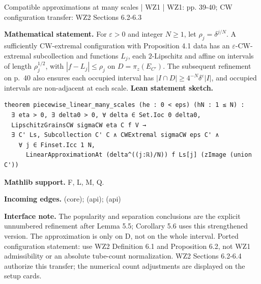 \documentclass[10pt,a4paper]{article}
\newcommand{\nodecard}[1]{\hyperlink{node-#1}{\texttt{\detokenize{#1}}}}
\begin{document}
\begin{minipage}{\linewidth}
\hypertarget{node-L5_5}{}
\begin{tcolorbox}[colback=white,colframe=regularityfg,colbacktitle=regularitybg,coltitle=ink,boxrule=0.45pt,arc=1.6mm,left=3mm,right=3mm,top=2mm,bottom=2mm,title={\sffamily\bfseries WZ1 Lemma 5.5 / CW \hfill \texttt{L5\_5}}]
{\sffamily\small\color{muted}Compatible approximations at many scales | WZ1 | WZ1: pp. 39-40; CW configuration transfer: WZ2 Sections 6.2-6.3}\par
\textbf{Mathematical statement.} For $\varepsilon>0$ and integer $N\ge1$, let $\rho_j=\delta^{j/N}$.
A sufficiently CW-extremal configuration with Proposition 4.1 data has an $\varepsilon$-CW-extremal subcollection and functions $L_j$, each $2$-Lipschitz and affine on intervals of length $\rho_j^{1/2}$, with $|f-L_j|\le\rho_j$ on $D=\pi_z(E_{C'})$.
The subsequent refinement on p.~40 also ensures each occupied interval has $|I\cap D|\ge4^{-N}\delta^\varepsilon |I|$, and occupied intervals are non-adjacent at each scale.
\smallskip\textbf{Lean statement sketch.}
\begin{Verbatim}[fontsize=\small,breaklines=true,breakanywhere=true,tabsize=2]
theorem piecewise_linear_many_scales (he : 0 < eps) (hN : 1 ≤ N) :
  ∃ eta > 0, ∃ delta0 > 0, ∀ delta ∈ Set.Ioc 0 delta0,
  LipschitzGrainsCW sigmaCW eta C f V →
  ∃ C' Ls, Subcollection C' C ∧ CWExtremal sigmaCW eps C' ∧
    ∀ j ∈ Finset.Icc 1 N,
      LinearApproximationAt (delta^((j:ℝ)/N)) f Ls[j] (zImage (union C'))
\end{Verbatim}
{\footnotesize\textbf{Mathlib support.} F, L, M, Q.\par
\textbf{Incoming edges.} \nodecard{L5_4} (core); \nodecard{Imass} (api); \nodecard{Iparams} (api)\par}
{\footnotesize\textbf{Interface note.} The popularity and separation conclusions are the explicit unnumbered refinement after Lemma 5.5; Corollary 5.6 uses this strengthened version. The approximation is only on D, not on the whole interval. Ported configuration statement: use WZ2 Definition 6.1 and Proposition 6.2, not WZ1 admissibility or an absolute tube-count normalization. WZ2 Sections 6.2-6.4 authorize this transfer; the numerical count adjustments are displayed on the setup cards.}
\end{tcolorbox}\end{minipage}\par\medskip
\end{document}
